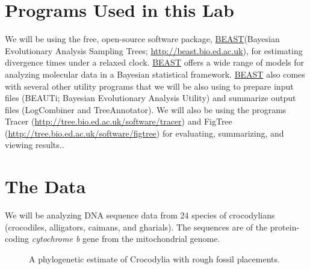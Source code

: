 \documentclass{article}
\newcommand{\program}[1]{#1\xspace}
\newcommand{\beast}{\href{http://beast.bio.ed.ac.uk/Main_Page}{\program{BEAST}}\xspace}
\begin{document}
\section{Programs Used in this Lab}
We will be using the free, open-source software package, \beast (Bayesian
Evolutionary Analysis Sampling Trees;
\href{http://beast.bio.ed.ac.uk}{\url{http://beast.bio.ed.ac.uk}}), for
estimating divergence times under a relaxed clock.
\beast offers a wide range of models for analyzing molecular data in
a Bayesian statistical framework.
\beast also comes with several other utility programs that we will be also
using to prepare input files (\program{BEAUTi}; Bayesian Evolutionary Analysis
Utility) and summarize output files (\program{LogCombiner and TreeAnnotator}).
We will also be using the programs \program{Tracer}
(\href{http://tree.bio.ed.ac.uk/software/tracer}{\url{http://tree.bio.ed.ac.uk/software/tracer}})
and \program{FigTree}
(\href{http://tree.bio.ed.ac.uk/software/figtree}{\url{http://tree.bio.ed.ac.uk/software/figtree}})
for evaluating, summarizing, and viewing results..

\section{The Data}
We will be analyzing DNA sequence data from 24 species of crocodylians
(crocodiles, alligators, caimans, and gharials).
The sequences are of the protein-coding \emph{cytochrome b} gene from the
mitochondrial genome.

    \begin{figure}[htbp]
        \centering
        \caption{A phylogenetic estimate of Crocodylia with rough fossil placements.}
        \label{fig:crocFossils}
    \end{figure}
\end{document}
